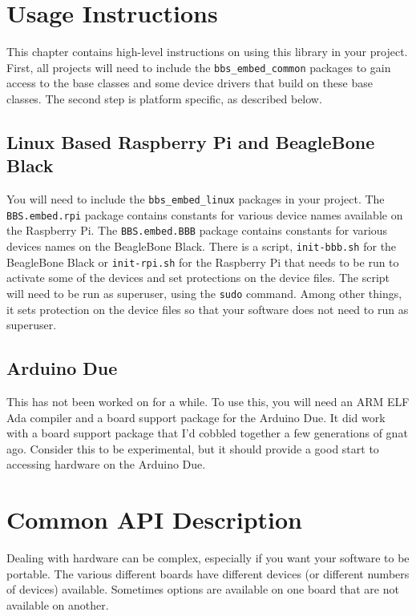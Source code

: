 \documentclass[10pt, openany]{book}
\newcommand{\package}[1]{\texttt{#1}}
\newcommand{\cli}[1]{\texttt{#1}}
\begin{document}
\chapter{Usage Instructions}
This chapter contains high-level instructions on using this library in your project.  First, all projects will need to include the \package{bbs\_embed\_common} packages to gain access to the base classes and some device drivers that build on these base classes.  The second step is platform specific, as described below.

\section{Linux Based Raspberry Pi and BeagleBone Black}
You will need to include the \package{bbs\_embed\_linux} packages in your project.  The \package{BBS.embed.rpi} package contains constants for various device names available on the Raspberry Pi.  The \package{BBS.embed.BBB} package contains constants for various devices names on the BeagleBone Black.  There is a script, \package{init-bbb.sh} for the BeagleBone Black or \package{init-rpi.sh} for the Raspberry Pi that needs to be run to activate some of the devices and set protections on the device files.  The script will need to be run as superuser, using the \cli{sudo} command.  Among other things, it sets protection on the device files so that your software does not need to run as superuser.

\section{Arduino Due}
This has not been worked on for a while.  To use this, you will need an ARM ELF Ada compiler and a board support package for the Arduino Due.  It did work with a board support package that I'd cobbled together a few generations of gnat ago.  Consider this to be experimental, but it should provide a good start to accessing hardware on the Arduino Due.

\chapter{Common API Description}
Dealing with hardware can be complex, especially if you want your software to be portable.  The various different boards have different devices (or different numbers of devices) available.  Sometimes options are available on one board that are not available on another.
\end{document}
